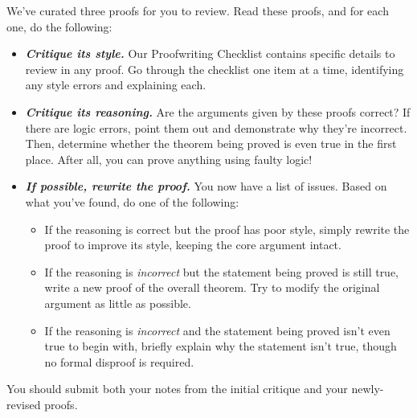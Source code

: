\documentclass{article}
\renewcommand{\(}{\left(}
\renewcommand{\)}{\right)}
\theoremstyle{plain}
\theoremstyle{plain}
\theoremstyle{definition}
\begin{document}
We've curated three proofs for you to review. Read these proofs, and for each one, do the following: 
\begin{itemize}
    \item \textit{\textbf{Critique its style.}} Our Proofwriting Checklist contains specific details to review in any proof. Go through the checklist one item at a time, identifying any style errors and explaining each. 
    \item \textit{\textbf{Critique its reasoning.}} Are the arguments given by these proofs correct? If there are logic errors, point them out and demonstrate why they're incorrect. Then, determine whether the theorem being proved is even true in the first place. After all, you can prove anything using faulty logic!
    \item \textit{\textbf{If possible, rewrite the proof.}} You now have a list of issues. Based on what you've found, do one of the following:
    \begin{itemize}
        \item If the reasoning is correct but the proof has poor style, simply rewrite the proof to improve its style, keeping the core argument intact.
        \item If the reasoning is \textit{incorrect} but the statement being proved is still true, write a new proof of the overall theorem. Try to modify the original argument as little as possible.
        \item If the reasoning is \textit{incorrect} and the statement being proved isn't even true to begin with, briefly explain why the statement isn't true, though no formal disproof is required.
    \end{itemize}
\end{itemize}

You should submit both your notes from the initial critique and your newly-revised proofs.
\end{document}
